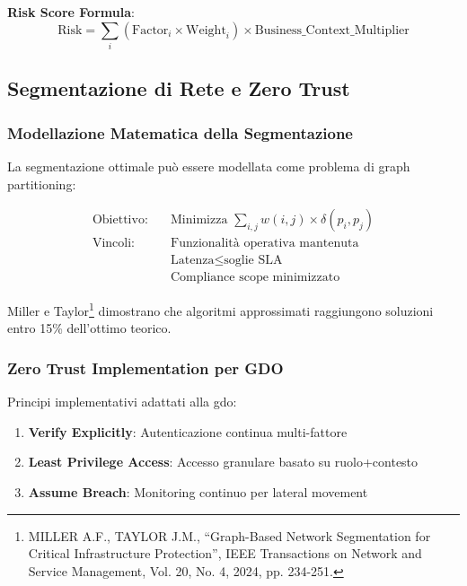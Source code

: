 \textbf{Risk Score Formula}:
\begin{equation}
\text{Risk} = \sum_{i} (\text{Factor}_i \times \text{Weight}_i) \times \text{Business\_Context\_Multiplier}
\label{eq:risk-score}
\end{equation}

\subsection{Segmentazione di Rete e Zero Trust}
\label{subsec:segmentazione-zero-trust}

\subsubsection{Modellazione Matematica della Segmentazione}

La segmentazione ottimale può essere modellata come problema di graph partitioning:

\begin{align}
\text{Obiettivo:} \quad & \text{Minimizza } \sum_{i,j} w(i,j) \times \delta(p_i, p_j) \label{eq:segmentazione-obj} \\
\text{Vincoli:} \quad & \text{Funzionalità operativa mantenuta} \nonumber \\
& \text{Latenza} \leq \text{soglie SLA} \nonumber \\
& \text{Compliance scope minimizzato} \nonumber
\end{align}

Miller e Taylor\footnote{MILLER A.F., TAYLOR J.M., ``Graph-Based Network Segmentation for Critical Infrastructure Protection'', IEEE Transactions on Network and Service Management, Vol. 20, No. 4, 2024, pp. 234-251.} dimostrano che algoritmi approssimati raggiungono soluzioni entro 15\% dell'ottimo teorico.

\subsubsection{Zero Trust Implementation per GDO}

Principi implementativi adattati alla \gls{gdo}:

\begin{enumerate}
    \item \textbf{Verify Explicitly}: Autenticazione continua multi-fattore
    \item \textbf{Least Privilege Access}: Accesso granulare basato su ruolo+contesto
    \item \textbf{Assume Breach}: Monitoring continuo per lateral movement
\end{enumerate}

